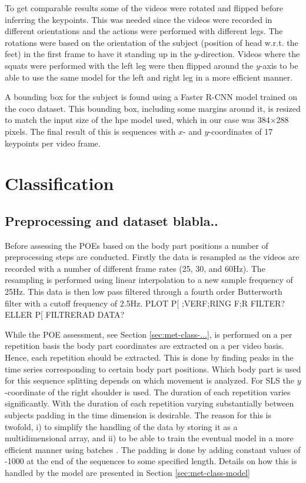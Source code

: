 To get comparable results some of the videos were rotated and flipped before inferring the keypoints. This was needed since the videos were recorded in different orientations and the actions were performed with different legs. The rotations were based on the orientation of the subject (position of head w.r.t. the feet) in the first frame to have it standing up in the $y$-direction. Videos where the squats were performed with the left leg were then flipped around the $y$-axis to be able to use the same model for the left and right leg in a more efficient manner.

A bounding box for the subject is found using a Faster R-CNN model trained on the \gls{coco} dataset. This bounding box, including some margins around it, is resized to match the input size of the \gls{hpe} model used, which in our case was 384$\times$288 pixels. The final result of this is sequences with $x$- and $y$-coordinates of 17 keypoints per video frame.

\section{Classification} \label{sec:met-class}

\subsection{Preprocessing and dataset blabla..} \label{esc:met-class-preproc}
Before assessing the POEs based on the body part positions a number of preprocessing steps are conducted. Firstly the data is resampled as the videos are recorded with a number of different frame rates (25, 30, and 60Hz). The resampling is performed using linear interpolation to a new sample frequency of 25Hz. This data is then low pass filtered through a fourth order Butterworth filter with a cutoff frequency of 2.5Hz. PLOT P[ ;VERF;RING F;R FILTER? ELLER P[ FILTRERAD DATA?

While the POE assessment, see Section \ref{sec:met-class-...}, is performed on a per repetition basis the body part coordinates are extracted on a per video basis. Hence, each repetition should be extracted. This is done by finding peaks in the time series corresponding to certain body part positions. Which body part is used for this sequence splitting depends on which movement is analyzed. For SLS the $y$-coordinate of the right shoulder is used. The duration of each repetition varies significantly. With the duration of each repetition varying substantially between subjects padding in the time dimension is desirable. The reason for this is twofold, i) to simplify the handling of the data by storing it as a multidimensional array, and ii) to be able to train the eventual model in a more efficient manner using batches \cite{Goodfellow2016}. The padding is done by adding constant values of -1000 at the end of the sequences to some specified length. Details on how this is handled by the model are presented in Section \ref{sec:met-class-model}

